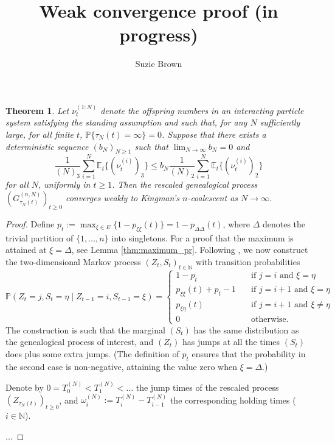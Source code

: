 \documentclass{article}
\title{Weak convergence proof (in progress)}
\author{Suzie Brown}
\newtheorem{theorem}{Theorem}
\newcommand{\Prob}{\mathbb{P}}
\newcommand{\Et}{\mathbb{E}_t}
\newcommand{\1}[1]{\mathbbm{1}_{#1}}
\begin{document}
\maketitle
\thispagestyle{fancy}

\begin{theorem}\label{thm:weakconv}
Let $\nu_t^{(1:N)}$ denote the offspring numbers in an interacting particle system satisfying the standing assumption and such that, for any $N$ sufficiently large, for all finite $t$, $\Prob\{ \tau_N(t) = \infty \} =0$. Suppose that there exists a deterministic sequence $(b_N)_{N\geq1}$ such that ${\lim}_{N\to\infty} b_N =0$ and
\begin{equation}\label{eq:mainthmcond}
\frac{1}{(N)_3} \sum_{i = 1}^N \Et\{ (\nu_t^{(i)})_3 \}  \leq b_N \frac{1}{(N)_2} \sum_{i = 1}^N \Et\{ (\nu_t^{(i)})_2 \}
\end{equation}
for all $N$, uniformly in $t \geq 1$.
Then the rescaled genealogical process $(G_{\tau_N(t)}^{(n,N)})_{t\geq0}$ converges weakly %
to Kingman's $n$-coalescent as $N \to \infty$.
\end{theorem}

\begin{proof}
Define $p_t := \max_{\xi\in E} \{1 - p_{\xi\xi}(t)\} = 1 - p_{\Delta\Delta}(t)$, where $\Delta$ denotes the trivial partition of $\{1,\dots,n\}$ into singletons. For a proof that the maximum is attained at $\xi = \Delta$, see Lemma \ref{thm:maximum_pr}. 
Following \citet{mohle1999}, we now construct the two-dimensional Markov process $(Z_t, S_t)_{t \in \mathbb{N}}$ with transition probabilities
\begin{equation}
\Prob(Z_t = j , S_t = \eta \mid Z_{t-1} = i, S_{t-1} = \xi)
= \begin{cases}
1 - p_t &\quad \text{if } j=i \text{ and } \xi=\eta \\
p_{\xi\xi}(t) + p_t - 1  &\quad \text{if } j=i+1 \text{ and } \xi=\eta \\
p_{\xi\eta}(t) &\quad \text{if } j=i+1 \text{ and } \xi\neq\eta \\
0 &\quad \text{otherwise} .
\end{cases}
\end{equation}
The construction is such that the marginal $(S_t)$ has the same distribution as the genealogical process of interest, and $(Z_t)$ has jumps at all the times $(S_t)$ does plus some extra jumps. (The definition of $p_t$ ensures that the probability in the second case is non-negative, attaining the value zero when $\xi=\Delta$.)

Denote by $0=T_0^{(N)}<T_1^{(N)}<\dots$ the jump times of the rescaled process $(Z_{\tau_N(t)})_{t\geq0}$, and $\omega_i^{(N)} := T_i^{(N)} - T_{i-1}^{(N)}$ the corresponding holding times ($i\in\mathbb{N}$).

...
\end{proof}
\end{document}
